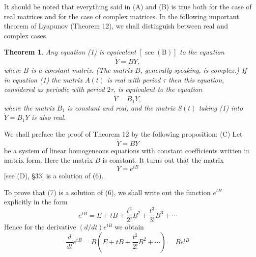 \documentclass[10pt,a5paper]{book}
\theoremstyle{plain}
\newtheorem{theorem}{Theorem}
\theoremstyle{definition}
\theoremstyle{remark}
\begin{document}
It should be noted that everything said in (A) and (B) is true both for the case of real matrices and for the case of complex matrices. In the following important theorem of Lyapunov (Theorem 12), we shall distinguish between real and complex cases.

\begin{theorem}
Any equation (1) is equivalent $[\operatorname{see}(\mathrm{B})]$ to the equation
\[
\dot{Y}=B Y,
\]
where $B$ is a constant matrix. (The matrix $B$, generally speaking, is complex.) If in equation (1) the matrix $A(t)$ is real with period $\tau$ then this equation, considered as periodic with period $2 \tau$, is equivalent to the equation
\[
\dot{Y}=B_{1} Y,
\]
where the matrix $B_{1}$ is constant and real, and the matrix $S(t)$ taking (1) into $\dot{Y}=B_{1} Y$ is also real.
\end{theorem}

We shall preface the proof of Theorem 12 by the following proposition: (C) Let
\begin{equation*}
\dot{Y}=B Y \tag{6}
\end{equation*}
be a system of linear homogeneous equations with constant coefficients written in matrix form. Here the matrix $B$ is constant. It turns out that the matrix
\begin{equation*}
Y=e^{t B} \tag{7}
\end{equation*}
[see (D), §33] is a solution of (6).

To prove that (7) is a solution of (6), we shall write out the function $e^{t B}$ explicitly in the form
\[
e^{t B}=E+t B+\frac{t^{2}}{2!} B^{2}+\frac{t^{3}}{3!} B^{3}+\cdots
\]
Hence for the derivative $(d / d t) e^{t B}$ we obtain
\[
\frac{d}{d t} e^{t B}=B\left(E+t B+\frac{t^{2}}{2!} B^{2}+\cdots\right)=B e^{t B}
\]
\end{document}
